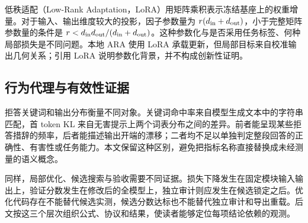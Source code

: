 低秩适配（Low-Rank Adaptation，LoRA）用矩阵乘积表示冻结基座上的权重增量\cite{hu2022lora}。对于输入、输出维度较大的投影，因子参数量为 $r(d_{\rm in}+d_{\rm out})$，小于完整矩阵参数量的条件是 $r<d_{\rm in}d_{\rm out}/(d_{\rm in}+d_{\rm out})$。这种参数化与是否采用任务标签、何种局部损失是不同问题。本地 ARA 使用 LoRA 承载更新，但局部目标来自校准输出几何关系；引用 LoRA 说明参数化背景，并不构成创新性证明。

\subsection{行为代理与有效性证据}

拒答关键词和输出分布衡量不同对象。关键词命中率来自模型生成文本中的字符串匹配，首 token KL 来自无害提示上两个词表分布之间的差异。前者能呈现某些拒答措辞的频率，后者能描述输出开端的漂移；二者均不足以单独判定整段回答的正确性、有害性或任务能力。本文保留这种区别，避免把指标名称直接替换成未经测量的语义概念。

同样，局部优化、候选搜索与验收需要不同证据。损失下降发生在固定模块输入输出上，验证分数发生在修改后的全模型上，独立审计则应发生在候选锁定之后。优化代码存在不能替代候选实测，候选分数达标也不能替代独立审计和导出重载。后文按这三个层次组织公式、协议和结果，使读者能够定位每项结论依赖的观测。
